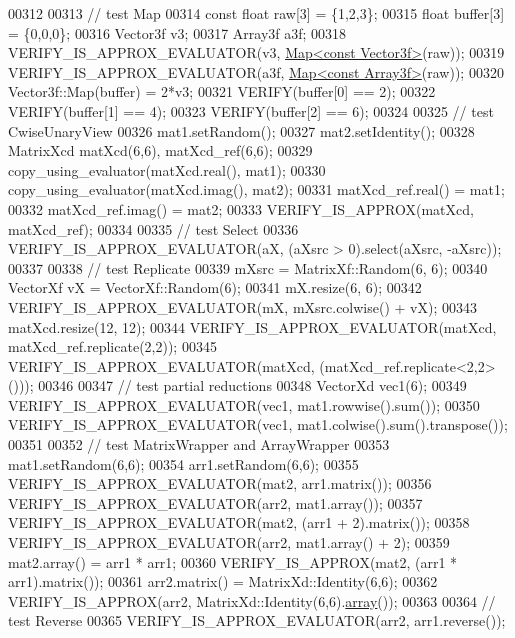 \begin{DoxyCode}
00312 
00313     \textcolor{comment}{// test Map}
00314     \textcolor{keyword}{const} \textcolor{keywordtype}{float} raw[3] = \{1,2,3\};
00315     \textcolor{keywordtype}{float} buffer[3] = \{0,0,0\};
00316     Vector3f v3;
00317     Array3f a3f;
00318     VERIFY\_IS\_APPROX\_EVALUATOR(v3, \hyperlink{group___core___module_class_eigen_1_1_map}{Map<const Vector3f>}(raw));
00319     VERIFY\_IS\_APPROX\_EVALUATOR(a3f, \hyperlink{group___core___module_class_eigen_1_1_map}{Map<const Array3f>}(raw));
00320     Vector3f::Map(buffer) = 2*v3;
00321     VERIFY(buffer[0] == 2);
00322     VERIFY(buffer[1] == 4);
00323     VERIFY(buffer[2] == 6);
00324 
00325     \textcolor{comment}{// test CwiseUnaryView}
00326     mat1.setRandom();
00327     mat2.setIdentity();
00328     MatrixXcd matXcd(6,6), matXcd\_ref(6,6);
00329     copy\_using\_evaluator(matXcd.real(), mat1);
00330     copy\_using\_evaluator(matXcd.imag(), mat2);
00331     matXcd\_ref.real() = mat1;
00332     matXcd\_ref.imag() = mat2;
00333     VERIFY\_IS\_APPROX(matXcd, matXcd\_ref);
00334 
00335     \textcolor{comment}{// test Select}
00336     VERIFY\_IS\_APPROX\_EVALUATOR(aX, (aXsrc > 0).select(aXsrc, -aXsrc));
00337 
00338     \textcolor{comment}{// test Replicate}
00339     mXsrc = MatrixXf::Random(6, 6);
00340     VectorXf vX = VectorXf::Random(6);
00341     mX.resize(6, 6);
00342     VERIFY\_IS\_APPROX\_EVALUATOR(mX, mXsrc.colwise() + vX);
00343     matXcd.resize(12, 12);
00344     VERIFY\_IS\_APPROX\_EVALUATOR(matXcd, matXcd\_ref.replicate(2,2));
00345     VERIFY\_IS\_APPROX\_EVALUATOR(matXcd, (matXcd\_ref.replicate<2,2>()));
00346 
00347     \textcolor{comment}{// test partial reductions}
00348     VectorXd vec1(6);
00349     VERIFY\_IS\_APPROX\_EVALUATOR(vec1, mat1.rowwise().sum());
00350     VERIFY\_IS\_APPROX\_EVALUATOR(vec1, mat1.colwise().sum().transpose());
00351 
00352     \textcolor{comment}{// test MatrixWrapper and ArrayWrapper}
00353     mat1.setRandom(6,6);
00354     arr1.setRandom(6,6);
00355     VERIFY\_IS\_APPROX\_EVALUATOR(mat2, arr1.matrix());
00356     VERIFY\_IS\_APPROX\_EVALUATOR(arr2, mat1.array());
00357     VERIFY\_IS\_APPROX\_EVALUATOR(mat2, (arr1 + 2).matrix());
00358     VERIFY\_IS\_APPROX\_EVALUATOR(arr2, mat1.array() + 2);
00359     mat2.array() = arr1 * arr1;
00360     VERIFY\_IS\_APPROX(mat2, (arr1 * arr1).matrix());
00361     arr2.matrix() = MatrixXd::Identity(6,6);
00362     VERIFY\_IS\_APPROX(arr2, MatrixXd::Identity(6,6).\hyperlink{class_eigen_1_1array}{array}());
00363 
00364     \textcolor{comment}{// test Reverse}
00365     VERIFY\_IS\_APPROX\_EVALUATOR(arr2, arr1.reverse());

\end{DoxyCode}
